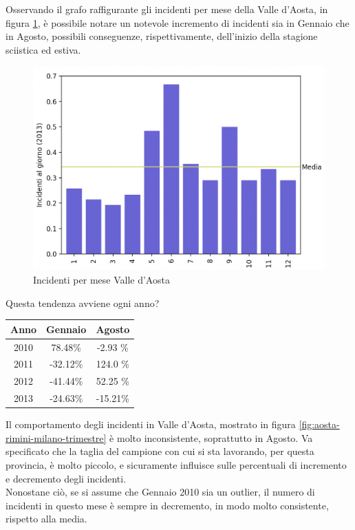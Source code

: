 \documentclass[a4paper]{report}
\begin{document}
Osservando il grafo raffigurante gli incidenti per mese della Valle d'Aosta, in figura \ref{fig:aosta}, 
è possibile notare un notevole incremento di incidenti sia in Gennaio che in Agosto, possibili 
conseguenze, rispettivamente, dell'inizio della stagione sciistica ed estiva.

\begin{figure}
    \includegraphics[width=\linewidth]{../src/incidenti/incidenti_senza_coords/mese_incidenti/aosta_mese.png}
    \caption{Incidenti per mese Valle d'Aosta}
    \label{fig:aosta}
\end{figure}

Questa tendenza avviene ogni anno?

\begin{center}
    \def\arraystretch{1.5}%
    \begin{tabular}{ |c|c|c| } 
    \hline
    Anno & Gennaio & Agosto \\ 
    \hline
    \rowcolor{TableGray}
    2010 & 78.48\%  & -2.93 \%\\ 
    2011 & -32.12\% & 124.0 \%\\
    \rowcolor{TableGray}
    2012 & -41.44\% & 52.25 \% \\
    2013 & -24.63\% & -15.21\% \\
    \hline
    \end{tabular}
\end{center}

Il comportamento degli incidenti in Valle d'Aosta, mostrato in figura 
\ref{fig:aosta-rimini-milano-trimestre} è molto inconsistente, soprattutto in Agosto.
Va specificato che la taglia del campione con cui si sta lavorando, per questa provincia, 
è molto piccolo, e sicuramente influisce sulle percentuali di incremento e decremento 
degli incidenti.\\
Nonostane ciò, se si assume che Gennaio 2010 sia un outlier, il numero di incidenti in 
questo mese è sempre in decremento, in modo molto consistente, rispetto alla media.
\end{document}
